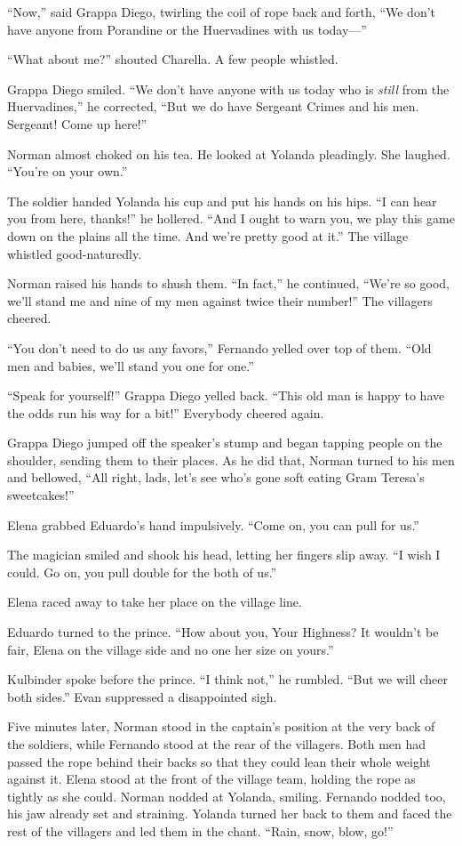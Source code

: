 \documentclass[10pt]{book}
\begin{document}
``Now,'' said Grappa Diego, twirling the coil of rope back and forth, ``We don't have anyone from Porandine or the Huervadines with us today---''

``What about me?'' shouted Charella. A few people whistled.

Grappa Diego smiled. ``We don't have anyone with us today who is \emph{still} from the Huervadines,'' he corrected, ``But we do have Sergeant Crimes and his men. Sergeant! Come up here!''

Norman almost choked on his tea. He looked at Yolanda pleadingly. She laughed. ``You're on your own.''

The soldier handed Yolanda his cup and put his hands on his hips. ``I can hear you from here, thanks!'' he hollered. ``And I ought to warn you, we play this game down on the plains all the time. And we're pretty good at it.'' The village whistled good-naturedly.

Norman raised his hands to shush them. ``In fact,'' he continued, ``We're so good, we'll stand me and nine of my men against twice their number!'' The villagers cheered.

``You don't need to do us any favors,'' Fernando yelled over top of them. ``Old men and babies, we'll stand you one for one.''

``Speak for yourself!'' Grappa Diego yelled back. ``This old man is happy to have the odds run his way for a bit!'' Everybody cheered again.

Grappa Diego jumped off the speaker's stump and began tapping people on the shoulder, sending them to their places. As he did that, Norman turned to his men and bellowed, ``All right, lads, let's see who's gone soft eating Gram Teresa's sweetcakes!''

Elena grabbed Eduardo's hand impulsively.  ``Come on, you can pull for us.''

The magician smiled and shook his head, letting her fingers slip away.  ``I wish I could.  Go on, you pull double for the both of us.''

Elena raced away to take her place on the village line.

Eduardo turned to the prince. ``How about you, Your Highness?  It wouldn't be fair, Elena on the village side and no one her size on yours.''

Kulbinder spoke before the prince. ``I think not,'' he rumbled. ``But we will cheer both sides.'' Evan suppressed a disappointed sigh.

Five minutes later, Norman stood in the captain's position at the very back of the soldiers, while Fernando stood at the rear of the villagers. Both men had passed the rope behind their backs so that they could lean their whole weight against it. Elena stood at the front of the village team, holding the rope as tightly as she could. Norman nodded at Yolanda, smiling. Fernando nodded too, his jaw already set and straining. Yolanda turned her back to them and faced the rest of the villagers and led them in the chant. ``Rain, snow, blow, go!''
\end{document}
